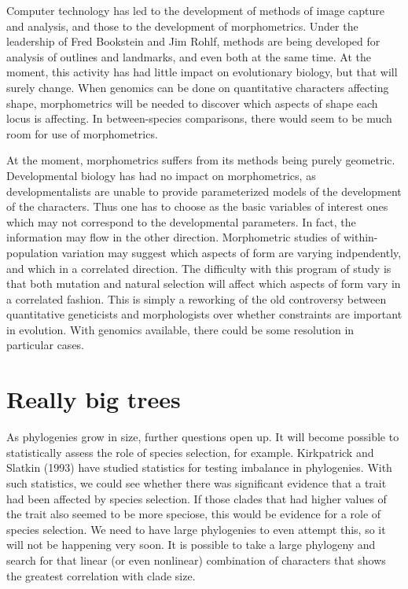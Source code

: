 \documentclass[12pt]{article}
\begin{document}
Computer technology has led to the development of methods of image
capture and analysis, and those to the development of morphometrics.
Under the leadership of Fred Bookstein and Jim Rohlf, methods are being
developed for analysis of outlines and landmarks, and even both at the same
time.  At the moment, this activity has had little impact on evolutionary
biology, but that will surely change.  When genomics can be done on
quantitative characters affecting shape, morphometrics will be needed to
discover which aspects of shape each locus is affecting.  In between-species
comparisons, there would seem to be much room for use of morphometrics.

At the moment, morphometrics suffers from its methods being purely geometric.
Developmental biology has had no impact on morphometrics, as developmentalists
are unable to provide parameterized models of the development of the
characters.  Thus one has to choose as the basic variables of interest ones
which may not correspond to the developmental parameters.  In fact, the
information may flow in the other direction.  Morphometric studies of
within-population variation may suggest which aspects of form are varying
indpendently, and which in a correlated direction.  The difficulty with this
program of study is that both mutation and natural selection will affect
which aspects of form vary in a correlated fashion.  This is simply a reworking
of the old controversy between quantitative geneticists and morphologists
over whether constraints are important in evolution.  With genomics
available, there could be some resolution in particular cases.

\section*{Really big trees}

As phylogenies grow in size, further questions open up.  It will become
possible to statistically assess the role of species selection, for example.
Kirkpatrick and Slatkin (1993) have studied statistics for testing
imbalance in phylogenies.  With such statistics, we could see whether there
was significant evidence that a trait had been affected by species
selection.  If those clades that had higher values of the trait also seemed to
be more speciose, this would be evidence for a role of species selection.
We need to have large phylogenies to even attempt this, so it will not be
happening very soon.  It is possible to take a large phylogeny and search
for that linear (or even nonlinear) combination of characters that shows the
greatest correlation with clade size.
\end{document}
